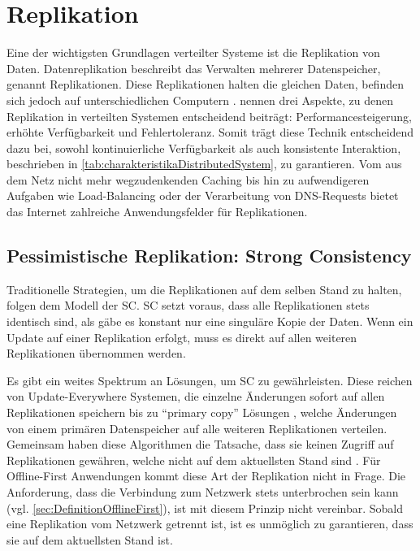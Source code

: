 \documentclass[a4paper, 12pt]{scrreprt}
\begin{document}
\section{Replikation}

Eine der wichtigsten Grundlagen verteilter Systeme ist die Replikation von Daten. Datenreplikation beschreibt das Verwalten mehrerer Datenspeicher, genannt Replikationen. Diese Replikationen halten die gleichen Daten, befinden sich jedoch auf unterschiedlichen Computern \autocite[S. 42]{ArticleOptimisticReplication}. \citet{BookDistributedSystemsConceptsAndDesign} nennen drei Aspekte, zu denen Replikation in verteilten Systemen entscheidend beiträgt: Performancesteigerung, erhöhte Verfügbarkeit und Fehlertoleranz. Somit trägt diese Technik entscheidend dazu bei, sowohl kontinuierliche Verfügbarkeit als auch konsistente Interaktion, beschrieben in \ref{tab:charakteristikaDistributedSystem}, zu garantieren. Vom aus dem Netz nicht mehr wegzudenkenden Caching bis hin zu aufwendigeren Aufgaben wie Load-Balancing oder der Verarbeitung von DNS-Requests bietet das Internet zahlreiche Anwendungsfelder für Replikationen. 

\subsection{Pessimistische Replikation: Strong Consistency}

Traditionelle Strategien, um die Replikationen auf dem selben Stand zu halten, folgen dem Modell der \ac{SC}. \ac{SC} setzt voraus, dass alle Replikationen stets identisch sind, als gäbe es konstant nur eine singuläre Kopie der Daten. Wenn ein Update auf einer Replikation erfolgt, muss es direkt auf allen weiteren Replikationen übernommen werden. 

Es gibt ein weites Spektrum an Lösungen, um \ac{SC} zu gewährleisten. Diese reichen von {Update-Everywhere} Systemen, die einzelne Änderungen sofort auf allen Replikationen speichern \autocite{ThesisUpdateEverywhere} bis zu \enquote{primary copy} Lösungen \autocite[S. 14]{BookPrimaryReplica}, welche Änderungen von einem primären Datenspeicher auf alle weiteren Replikationen verteilen. Gemeinsam haben diese Algorithmen die Tatsache, dass sie keinen Zugriff auf Replikationen gewähren, welche nicht auf dem aktuellsten Stand sind \autocite[S. 43]{ArticleOptimisticReplication}. Für Offline-First Anwendungen kommt diese Art der Replikation nicht in Frage. Die Anforderung, dass die Verbindung zum Netzwerk stets unterbrochen sein kann (vgl. \ref{sec:DefinitionOfflineFirst}), ist mit diesem Prinzip nicht vereinbar. Sobald eine Replikation vom Netzwerk getrennt ist, ist es unmöglich zu garantieren, dass sie auf dem aktuellsten Stand ist.
\end{document}
